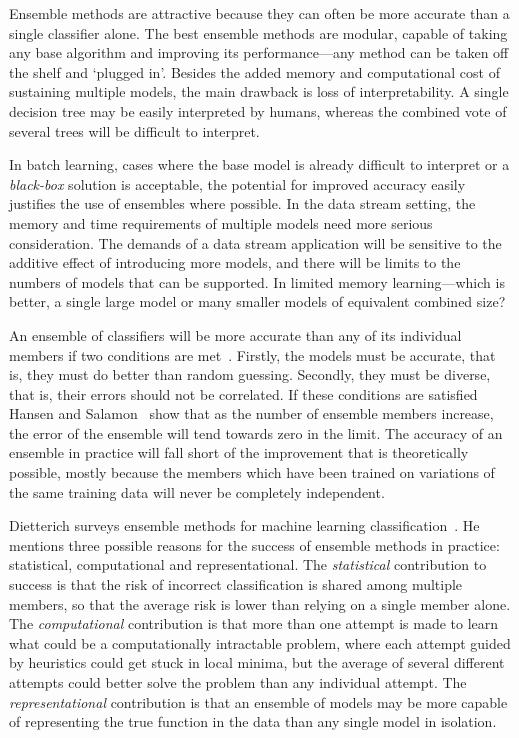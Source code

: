 Ensemble methods are attractive because they can often be more accurate
than a single classifier alone. The best ensemble methods are modular,
capable of taking any base algorithm and improving its performance---any
method can be taken off the shelf and `plugged in'. Besides the added
memory and computational cost of sustaining multiple models, the main drawback
is loss of interpretability. A single decision tree may be easily
interpreted by humans, whereas the combined vote of several trees will be difficult to interpret.

In batch learning, cases where the base model is already difficult to
interpret or a {\em black-box} solution is acceptable, the potential for
improved accuracy easily justifies the use of ensembles where
possible. In the data stream setting, the memory and time requirements of
multiple models need more serious consideration. The demands of a data
stream application will be sensitive to the additive effect of
introducing more models, and there will be limits to the numbers of models
that can be supported. In limited memory learning---which is better, a single large model or many smaller models of equivalent combined size?

An ensemble of classifiers will be more accurate than any of its individual members if two conditions are met~\cite{nnensembles, tgensembles}. Firstly, the models must be accurate, that is, they must do better than random guessing. Secondly, they must be diverse, that is, their errors should not be correlated. If these conditions are satisfied Hansen and Salamon~\cite{nnensembles} show that as the number of ensemble members increase, the error of the ensemble will tend towards zero in the limit. The accuracy of an ensemble in practice will fall short of the improvement that is theoretically possible, mostly because the members which have been trained on variations of the same training data will never be completely independent.

Dietterich surveys ensemble methods for machine learning classification~\cite{dietterichensembles}. He mentions three possible reasons for the success of ensemble methods in practice: statistical, computational and representational. The {\em statistical} contribution to success is that the risk of incorrect classification is shared among multiple members, so that the average risk is lower than relying on a single member alone. The {\em computational} contribution is that more than one attempt is made to learn what could be a computationally intractable problem, where each attempt guided by heuristics could get stuck in local minima, but the average of several different attempts could better solve the problem than any individual attempt. The {\em representational} contribution is that an ensemble of models may be more capable of representing the true function in the data than any single model in isolation.

